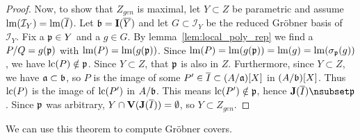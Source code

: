\begin{proof}
  Now, to show that $Z_{gen}$ is maximal, let $Y \subset Z$ be parametric and assume $\operatorname{lm}(\mathcal I_{Y}) = \operatorname{lm}(\overline I)$. Let $\mathfrak{b} = \operatorname{\mathbf I}(\overline Y)$ and let $G \subset \mathcal I_{Y}$ be the reduced Gröbner basis of $\mathcal I_{Y}$. Fix a $\mathfrak p \in Y$ and a $g \in G$. By lemma~\ref{lem:local_poly_rep} we find a $P/Q = g(\mathfrak p)$ with $\operatorname{lm}(P) = \operatorname{lm}(g(\mathfrak p))$. Since $\operatorname{lm}(P) = \operatorname{lm}(g(\mathfrak p)) = \operatorname{lm}(g) = \operatorname{lm}(\sigma_{\mathfrak p}(g))$, we have $\operatorname{lc}(P) \notin \mathfrak p$. Since $Y \subset Z$, that $\mathfrak p$ is also in $Z$. Furthermore, since $Y \subset Z$, we have $\mathfrak{a} \subset \mathfrak{b}$, so $P$ is the image of some $P' \in \overline I \subset (A/\mathfrak{a})[X]$ in $(A/\mathfrak{b})[X]$. Thus $\operatorname{lc}(P)$ is the image of $\operatorname{lc}(P')$ in $A/\mathfrak{b}$. This means $\operatorname{lc}(P') \notin \mathfrak p$, hence $\J(\overline I) \nsubset \p$. Since $\mathfrak p$ was arbitrary, $Y \cap \operatorname{\mathbf V}(\operatorname{\mathbf J}(\overline I)) = \emptyset$, so $Y \subset Z_{gen}$.
\end{proof}

We can use this theorem to compute Gröbner covers.

